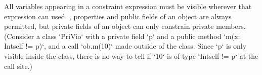 All variables appearing in a constraint expression must be visible wherever
that expression can used.  \Eg, properties and public fields of an object are
always permitted, but private fields of an object can only constrain private
members.  (Consider a class \xcd`PriVio` with a private field \xcd`p` and a
public method \xcd`m(x: Int{self != p})`, and a call \xcd`ob.m(10)` made
outside of the class. Since \xcd`p` is only visible inside the class, there is
no way to tell if \xcd`10` is of type \xcd`Int{self != p}` at the call site.)






